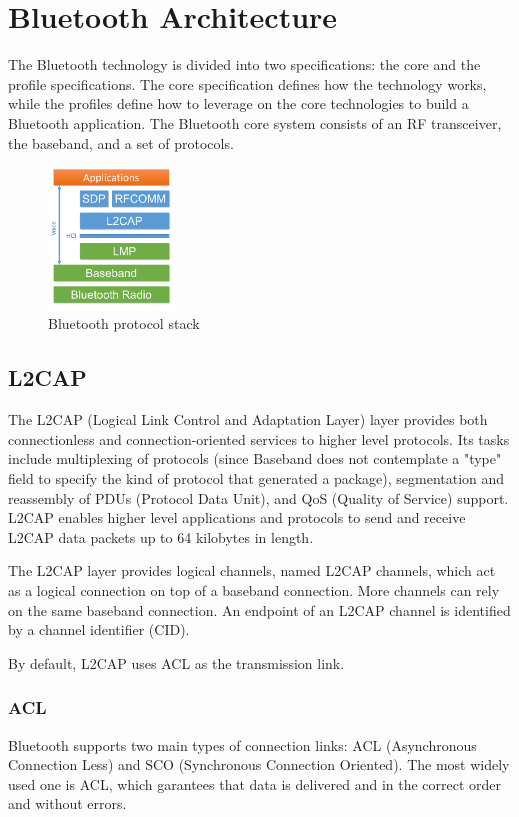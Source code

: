 \section{Bluetooth Architecture}
The Bluetooth technology is divided into two specifications: the core and the profile specifications. The core specification defines how the technology works, while the profiles define how to leverage on the core technologies to build a Bluetooth application.
The Bluetooth core system consists of an RF transceiver, the baseband, and a set of protocols.

\begin{figure}[ht!]
  \centering
  \includegraphics[width=0.3\textwidth]{img/stack.png} 
  \caption{Bluetooth protocol stack}
  \label{img:bt-protocol-stack}
\end{figure}

\subsection{L2CAP}
The L2CAP (Logical Link Control and Adaptation Layer) layer provides both connectionless and connection-oriented services to higher level protocols. Its tasks include multiplexing of protocols (since Baseband does not contemplate a "type" field to specify the kind of protocol that generated a package), segmentation and reassembly of PDUs (Protocol Data Unit), and QoS (Quality of Service) support.
L2CAP enables higher level applications and protocols to send and receive L2CAP data packets up to 64 kilobytes in length.

The L2CAP layer provides logical channels, named L2CAP channels, which act as a logical connection on top of a baseband connection.
More channels can rely on the same baseband connection.
An endpoint of an L2CAP channel is identified by a channel identifier (CID).

By default, L2CAP uses ACL as the transmission link.

\subsubsection{ACL}
Bluetooth supports two main types of connection links: ACL (Asynchronous Connection Less) and SCO (Synchronous Connection Oriented).
The most widely used one is ACL, which garantees that data is delivered and in the correct order and without errors.

